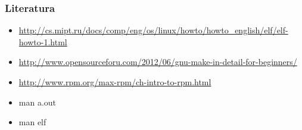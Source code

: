 \documentclass[table,usenames,dvipsnames]{beamer}
\begin{document}

\begin{frame}[t]
	\frametitle{Literatura}
	\begin{itemize}
		\item \url{http://cs.mipt.ru/docs/comp/eng/os/linux/howto/howto\_english/elf/elf-howto-1.html}
		\item \url{http://www.opensourceforu.com/2012/06/gnu-make-in-detail-for-beginners/}
		\item \url{http://www.rpm.org/max-rpm/ch-intro-to-rpm.html}
	\end{itemize}
	
	\begin{itemize}
		\item man a.out
		\item man elf
	\end{itemize}
\end{frame}
	
\end{document}
